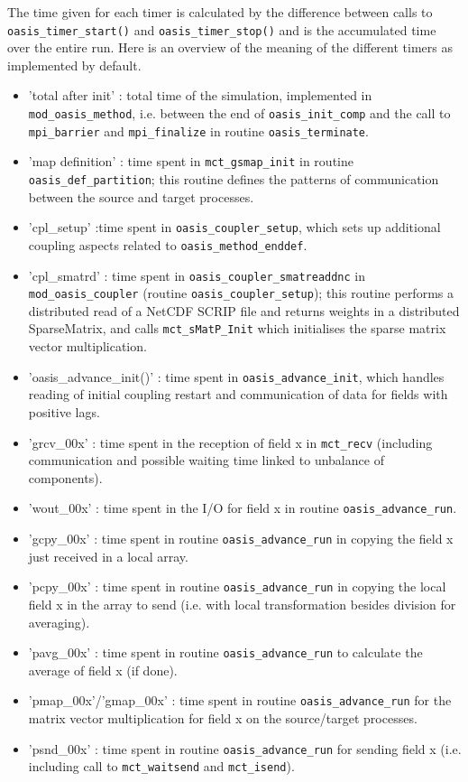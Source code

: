 The time given for each timer is calculated by the difference between calls to {\tt  oasis\_timer\_start()} and {\tt oasis\_timer\_stop()} and is the accumulated time over the entire run. Here is an overview of the meaning of the different timers as implemented by default. 

\begin{itemize}
\item {'total after init'} : total time of the simulation, implemented in {\tt mod\_oasis\_method}, i.e. between the end of {\tt oasis\_init\_comp} and the call to {\tt mpi\_barrier} and {\tt mpi\_finalize} in routine {\tt oasis\_terminate}.
\item {'map definition'} : time spent in {\tt mct\_gsmap\_init} in routine {\tt oasis\_def\_partition}; this routine defines the patterns of communication between the source and target processes.
\item {'cpl\_setup'} :time spent in {\tt oasis\_coupler\_setup}, which sets up additional coupling aspects related to {\tt oasis\_method\_enddef}.
\item {'cpl\_smatrd'} : time spent in {\tt oasis\_coupler\_smatreaddnc} in {\tt mod\_oasis\_coupler} (routine {\tt oasis\_coupler\_setup}); this routine performs a distributed read of a NetCDF SCRIP file and returns weights in a distributed SparseMatrix, and calls {\tt mct\_sMatP\_Init} which initialises the sparse matrix vector multiplication.
\item {'oasis\_advance\_init()'} : time spent in {\tt oasis\_advance\_init}, which handles reading of initial coupling  restart and communication of data for fields with positive lags.
\item {'grcv\_00x'} : time spent in the reception of field x in {\tt mct\_recv} (including communication and possible waiting time linked to unbalance of components).
\item {'wout\_00x'} : time spent in the I/O for field x in routine {\tt oasis\_advance\_run}.
\item {'gcpy\_00x'} : time spent in routine {\tt oasis\_advance\_run} in copying the field x just received in a local array.
\item {'pcpy\_00x'} : time spent in routine {\tt oasis\_advance\_run} in copying the local field x in the array to send (i.e. with local transformation besides division for averaging).
\item {'pavg\_00x'} : time spent in routine {\tt oasis\_advance\_run} to calculate the average of field x (if done).
\item {'pmap\_00x'/'gmap\_00x'} : time spent in routine {\tt oasis\_advance\_run} for the matrix vector multiplication for field x on the source/target processes.
\item {'psnd\_00x'} : time spent in routine {\tt oasis\_advance\_run} for sending field x (i.e. including call to {\tt mct\_waitsend} and {\tt mct\_isend}).
\end{itemize}

